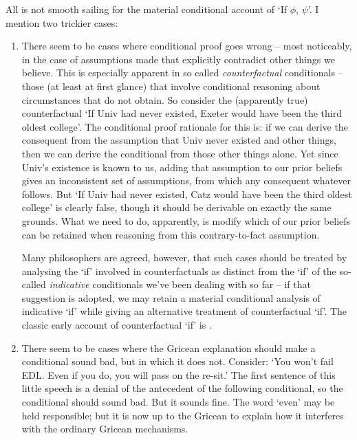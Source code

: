 All is not smooth sailing for the material conditional account of `If $\phi$, $\psi$'. I mention two trickier cases: \begin{enumerate}
	\item There seem to be cases where conditional proof goes wrong – most noticeably, in the case of assumptions made that explicitly contradict other things we believe. This is especially apparent in so called \emph{counterfactual} conditionals – those (at least at first glance) that involve conditional reasoning about circumstances that do not obtain. So consider the (apparently true) counterfactual `If Univ had never existed, Exeter would have been the third oldest college'. The conditional proof rationale for this is: if we can derive the consequent from the assumption that Univ never existed and other things, then we can derive the conditional from those other things alone. Yet since Univ's existence is known to us, adding that assumption to our prior beliefs gives an inconsistent set of assumptions, from which any consequent whatever follows. But `If Univ had never existed, Catz would have been the third oldest college' is clearly false, though it should be derivable on exactly the same grounds. What we need to do, apparently, is modify which of our prior beliefs can be retained when reasoning from this contrary-to-fact assumption.

	 Many philosophers are agreed, however, that such cases should be treated by analysing the `if' involved in counterfactuals as distinct from the `if' of the so-called \emph{indicative} conditionals we've been dealing with so far – if that suggestion is adopted, we may retain a material conditional analysis of indicative `if' while giving an alternative treatment of counterfactual `if'. The classic early account of counterfactual `if' is \citet{lewcount}.
\item There seem to be cases where the Gricean explanation should make a conditional sound bad, but in which it does not. Consider: `You won't fail EDL. Even if you do, you will pass on the re-sit.' The first sentence of this little speech is a denial of the antecedent of the following conditional, so the conditional should sound bad. But it sounds fine. The word `even' may be held responsible; but it is now up to the Gricean to explain how it interferes with the ordinary Gricean mechanisms.
\end{enumerate}

